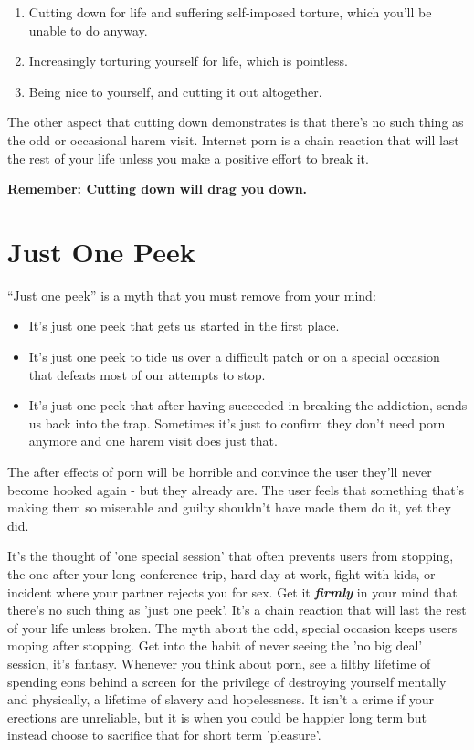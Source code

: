 \documentclass[
]{book}
\begin{document}
\begin{enumerate}
\def\labelenumi{\arabic{enumi}.}
\item
  Cutting down for life and suffering self-imposed torture, which you'll be unable to do anyway.
\item
  Increasingly torturing yourself for life, which is pointless.
\item
  Being nice to yourself, and cutting it out altogether.
\end{enumerate}

The other aspect that cutting down demonstrates is that there's no such thing as the odd or occasional harem visit. Internet porn is a chain reaction that will last the rest of your life unless you make a positive effort to break it.

\textbf{Remember: Cutting down will drag you down.}

\hypertarget{just-one-peek}{%
\chapter{Just One Peek}\label{just-one-peek}}

``Just one peek'' is a myth that you must remove from your mind:

\begin{itemize}
\item
  It's just one peek that gets us started in the first place.
\item
  It's just one peek to tide us over a difficult patch or on a special occasion that defeats most of our attempts to stop.
\item
  It's just one peek that after having succeeded in breaking the addiction, sends us back into the trap. Sometimes it's just to confirm they don't need porn anymore and one harem visit does just that.
\end{itemize}

The after effects of porn will be horrible and convince the user they'll never become hooked again - but they already are. The user feels that something that's making them so miserable and guilty shouldn't have made them do it, yet they did.

It's the thought of 'one special session' that often prevents users from stopping, the one after your long conference trip, hard day at work, fight with kids, or incident where your partner rejects you for sex. Get it \textbf{\emph{firmly}} in your mind that there's no such thing as 'just one peek'. It's a chain reaction that will last the rest of your life unless broken. The myth about the odd, special occasion keeps users moping after stopping. Get into the habit of never seeing the 'no big deal' session, it's fantasy. Whenever you think about porn, see a filthy lifetime of spending eons behind a screen for the privilege of destroying yourself mentally and physically, a lifetime of slavery and hopelessness. It isn't a crime if your erections are unreliable, but it is when you could be happier long term but instead choose to sacrifice that for short term 'pleasure'.
\end{document}
